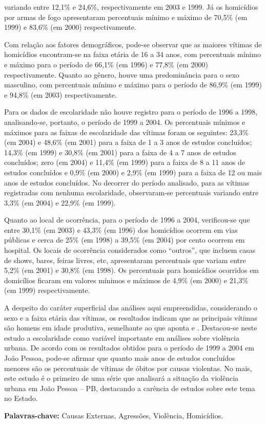 \documentclass[12pt]{article}
\begin{document}
variando entre 12,1\% e 24,6\%, respectivamente em 2003 e 1999. Já os homicídios por armas
de fogo apresentaram percentuais mínimo e máximo de 70,5\% (em 1999) e 83,6\% (em 2000)
respectivamente.
\par Com relação aos fatores demográficos, pode-se observar que as maiores vítimas de
homicídios encontram-se na faixa etária de 16 a 34 anos, com percentuais mínimo e máximo
para o período de 66,1\% (em 1996) e 77,8\% (em 2000) respectivamente. Quanto ao gênero,
houve uma predominância para o sexo masculino, com percentuais mínimo e máximo para o
período de 86,9\% (em 1999) e 94,8\% (em 2003) respectivamente.
\par Para os dados de escolaridade não houve registro para o período de 1996 a 1998, analisando-se,
portanto, o período de 1999 a 2004. Os percentuais mínimos e máximos para as faixas de
escolaridade das vítimas foram os seguintes: 23,3\% (em 2004) e 48,6\% (em 2001) para a
faixa de 1 a 3 anos de estudos concluídos; 14,3\% (em 1999) e 30,8\% (em 2001) para a faixa
de 4 a 7 anos de estudos concluídos; zero (em 2004) e 11,4\% (em 1999) para a faixa de 8 a 11
anos de estudos concluídos e 0,9\% (em 2000) e 2,9\% (em 1999) para a faixa de 12 ou mais
anos de estudos concluídos. No decorrer do período analisado, para as vítimas registradas
com nenhuma escolaridade, observaram-se percentuais variando entre 3,3\% (em 2004) e
22,9\% (em 1999).
\par Quanto ao local de ocorrência, para o período de 1996 a 2004, verificou-se que entre 30,1\%
(em 2003) e 43,3\% (em 1996) dos homicídios ocorrem em vias públicas e cerca de 25\% (em
1998) a 39,5\% (em 2004) por cento ocorrem em hospital. Os locais de ocorrência
considerados como “outros”, que incluem casas de shows, bares, feiras livres, etc,
apresentaram percentuais que variam entre 5,2\% (em 2001) e 30,8\% (em 1998). Os
percentuais para homicídios ocorridos em domicílios ficaram em valores mínimos e máximos
de 4,9\% (em 2000) e 21,3\% (em 1999) respectivamente.
\par A despeito do caráter superficial das análises aqui empreendidas, considerando o sexo e a
faixa etária das vítimas, os resultados indicam que as principais vítimas são homens em idade
produtiva, semelhante ao que aponta  e . Destacou-se neste estudo a escolaridade como variável importante em análises
sobre violência urbana. De acordo com os resultados obtidos para o período de 1999 a 2004
em João Pessoa, pode-se afirmar que quanto mais anos de estudos concluídos menores são os
percentuais de vítimas de óbitos por causas violentas. No mais, este estudo é o primeiro de
uma série que analisará a situação da violência urbana em João Pessoa – PB, destacando a
carência de estudos sobre este tema no Estado.\\
\vspace{12pt}
\par\noindent \textbf{Palavras-chave:} Causas Externas, Agressões, Violência, Homicídios.

\end{document}
